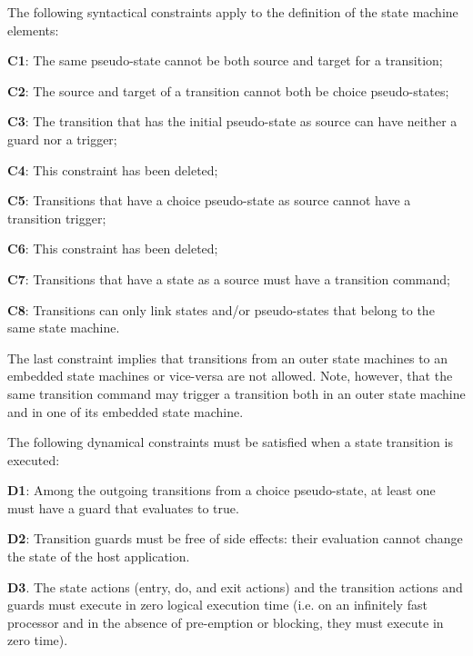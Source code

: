 The following syntactical constraints apply to the definition of the state machine elements:

\begin{fw_itemize}
\item{\textbf{C1}}: The same pseudo-state cannot be both source and target for a transition;
\item{\textbf{C2}}: The source and target of a transition cannot both be choice pseudo-states;
\item{\textbf{C3}}: The transition that has the initial pseudo-state as source can have neither a guard nor a trigger;
\item{\textbf{C4}}: This constraint has been deleted;
\item{\textbf{C5}}: Transitions that have a choice pseudo-state as source cannot have a transition trigger;
\item{\textbf{C6}}: This constraint has been deleted;
\item{\textbf{C7}}: Transitions that have a state as a source must have a transition command;
\item{\textbf{C8}}: Transitions can only link states and/or pseudo-states that belong to the same state machine.
\end{fw_itemize}

The last constraint implies that transitions from an outer state machines to an embedded state machines or vice-versa are not allowed. Note, however, 
that the same transition command may trigger a transition both in an outer state machine and in one of its embedded state machine. 

The following dynamical constraints must be satisfied when a state transition is executed: 

\begin{fw_itemize}
\item{\textbf{D1}}: Among the outgoing transitions from a choice pseudo-state, at least one must have a guard that evaluates to true.
\item{\textbf{D2}}: Transition guards must be free of side effects: their evaluation cannot change the state of the host application.
\item{\textbf{D3}}. The state actions (entry, do, and exit actions) and the transition actions and guards must execute
in zero logical execution time (i.e. on an infinitely fast processor and in the absence of pre-emption or blocking, 
they must execute in zero time).
\end{fw_itemize}

